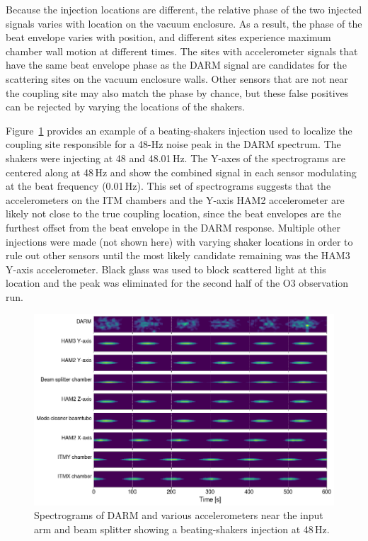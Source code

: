 Because the injection locations are different, the relative phase of the two injected signals varies with location on the vacuum enclosure.
As a result, the phase of the beat envelope varies with position, and different sites experience maximum chamber wall motion at different times.
The sites with accelerometer signals that have the same beat envelope phase as the \ac{DARM} signal are candidates for the scattering sites on the vacuum enclosure walls.
Other sensors that are not near the coupling site may also match the phase by chance, but these false positives can be rejected by varying the locations of the shakers.

Figure~\ref{fig:beats} provides an example of a beating-shakers injection used to localize the coupling site responsible for a 48\hyp Hz noise peak in the \ac{DARM} spectrum.
The shakers were injecting at 48 and 48.01\,Hz. The Y-axes of the spectrograms are centered along at 48\,Hz and show the combined signal in each sensor modulating at the beat frequency (0.01\,Hz).
This set of spectrograms suggests that the accelerometers on the \ac{ITM} chambers and the Y-axis HAM2 accelerometer are likely not close to the true coupling location, since the beat envelopes are the furthest offset from the beat envelope in the \ac{DARM} response.
Multiple other injections were made (not shown here) with varying shaker locations in order to rule out other sensors until the most likely candidate remaining was the HAM3 Y-axis accelerometer.
Black glass was used to block scattered light at this location and the peak was eliminated for the second half of the O3 observation run.

\begin{figure}[h!]
	\centering
	\includegraphics[width=\textwidth]{figures/beat-spectrograms.png}
	\caption{
		Spectrograms of DARM and various accelerometers near the input arm and beam splitter showing a beating-shakers injection at 48\,Hz.}
	\label{fig:beats}
\end{figure}

